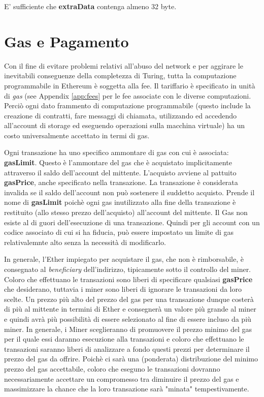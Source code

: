 \documentclass[9pt,oneside]{amsart}
\begin{document}
\begin{multicols}{2}
E' sufficiente che \textbf{extraData} contenga almeno 32 byte.

\section{Gas e Pagamento} \label{ch:payment}

Con il fine di evitare problemi relativi all'abuso del network e per aggirare le inevitabili conseguenze della completezza di Turing, tutta la computazione programmabile in Ethereum è soggetta alla fee. Il tariffario è specificato in unità di \textit{gas} (see Appendix \ref{app:fees} per le fee associate con le diverse computazioni. Perciò ogni dato frammento di computazione programmabile (questo include la creazione di contratti, fare messaggi di chiamata, utilizzando ed accedendo all'account di storage ed eseguendo operazioni sulla macchina virtuale) ha un costo universalmente accettato in termi di gas.

Ogni transazione ha uno specifico ammontare di gas con cui è associata: \textbf{gasLimit}. Questo è l'ammontare del gas che è acquistato implicitamente attraverso il saldo dell'account del mittente. L'acquisto avviene al pattuito \textbf{gasPrice}, anche specificato nella transazione. La transazione è considerata invalida se il saldo dell'account non può sostenere il suddetto acquisto. Prende il nome di \textbf{gasLimit} poichè ogni gas inutilizzato alla fine della transazione è restituito (allo stesso prezzo dell'acquisto) all'account del mittente. Il Gas non esiste al di guori dell'esecuzione di una transazione. Quindi per gli account con un codice associato di cui si ha fiducia, può essere impostato un limite di gas relativalemnte alto senza la necessità di modificarlo.

In generale, l'Ether impiegato per acquistare il gas, che non è rimborsabile, è consegnato al \textit{beneficiary} dell'indirizzo, tipicamente sotto il controllo del miner. Coloro che effettuano le transazioni sono liberi di specificare qualsiasi \textbf{gasPrice} che desiderano, tuttavia i miner sono liberi di ignorare le transazioni da loro scelte. Un prezzo più alto del prezzo del gas per una transazione dunque costerà di più al mittente in termini di Ether e consegnerà un valore più grande al miner e quindi avrà più possibilità di essere selezionato al fine di essere incluso da più miner. In generale, i Miner sceglieranno di promuovere il prezzo minimo del gas per il quale essi daranno esecuzione alla transazioni e coloro che effettuano le transazioni saranno liberi di analizzare a fondo questi prezzi per determinare il prezzo del gas da offrire. Poichè ci sarà una (ponderata) distribuzione del minimo prezzo del gas accettabile, coloro che eseguno le transazioni dovranno necessariamente accettare un compromesso tra diminuire il prezzo del gas e massimizzare la chance che la loro transazione sarà "minata" tempestivamente.


\end{multicols}
\end{document}
